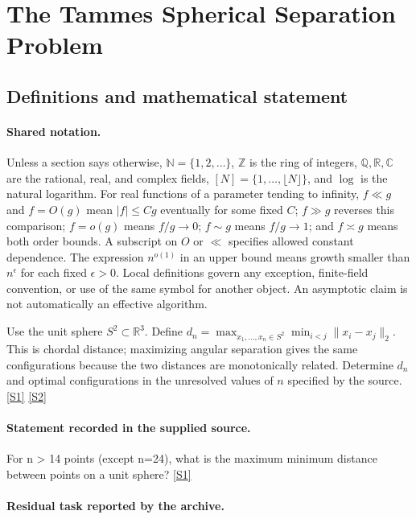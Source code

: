 \documentclass[11pt,a4paper]{article}
\newcommand{\N}{\mathbb{N}}
\newcommand{\Z}{\mathbb{Z}}
\newcommand{\Q}{\mathbb{Q}}
\newcommand{\R}{\mathbb{R}}
\newcommand{\C}{\mathbb{C}}
\newcommand{\sref}[2]{\hyperlink{source:#1:#2}{[S#2]}}
\begin{document}
\section{The Tammes Spherical Separation Problem}\label{statement}


\subsection{Definitions and mathematical statement}

\paragraph{Shared notation.}Unless a section says otherwise, $\N=\{1,2,\ldots\}$,
$\Z$ is the ring of integers, $\Q,\R,\C$ are the rational, real, and complex
fields, $[N]=\{1,\ldots,\lfloor N\rfloor\}$, and $\log$ is the natural
logarithm. For real functions of a parameter tending to infinity,
$f\ll g$ and $f=O(g)$ mean $|f|\leq Cg$ eventually for some fixed $C$;
$f\gg g$ reverses this comparison; $f=o(g)$ means $f/g\to0$;
$f\sim g$ means $f/g\to1$; and $f\asymp g$ means both order bounds.
A subscript on $O$ or $\ll$ specifies allowed constant dependence.
The expression $n^{o(1)}$ in an upper bound means growth smaller than
$n^\epsilon$ for each fixed $\epsilon>0$. Local definitions govern any
exception, finite-field convention, or use of the same symbol for another
object. An asymptotic claim is not automatically an effective algorithm.



Use the unit sphere $S^2\subset\R^3$. Define $d_n=\max_{x_1,\ldots,x_n\in S^2}\min_{i<j}\|x_i-x_j\|_2$. This is chordal distance; maximizing angular separation gives the same configurations because the two distances are monotonically related. Determine $d_n$ and optimal configurations in the unresolved values of $n$ specified by the source. \sref{statement}{1} \sref{statement}{2}

\paragraph{Statement recorded in the supplied source.}
For n > 14 points (except n=24), what is the maximum minimum distance between points on a unit sphere? \sref{statement}{1}

\paragraph{Residual task reported by the archive.}
\end{document}

